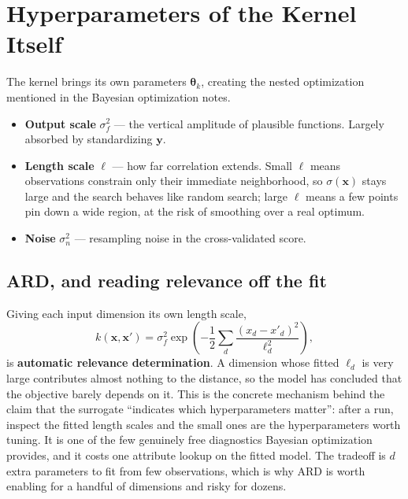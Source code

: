 \documentclass[conference]{IEEEtran}
\begin{document}
\section*{Hyperparameters of the Kernel Itself}
The kernel brings its own parameters $\boldsymbol{\theta}_k$, creating the nested optimization mentioned in the Bayesian optimization notes.

\begin{itemize}
    \item \textbf{Output scale} $\sigma_f^2$ --- the vertical amplitude of plausible functions. Largely absorbed by standardizing $\mathbf{y}$.
    \item \textbf{Length scale} $\ell$ --- how far correlation extends. Small $\ell$ means observations constrain only their immediate neighborhood, so $\sigma(\mathbf{x})$ stays large and the search behaves like random search; large $\ell$ means a few points pin down a wide region, at the risk of smoothing over a real optimum.
    \item \textbf{Noise} $\sigma_n^2$ --- resampling noise in the cross-validated score.
\end{itemize}

\subsection*{ARD, and reading relevance off the fit}
Giving each input dimension its own length scale,
\begin{equation}
    k(\mathbf{x},\mathbf{x}') = \sigma_f^2 \exp\!\left(-\frac{1}{2}\sum_{d} \frac{(x_d - x'_d)^2}{\ell_d^2}\right),
\end{equation}
is \textbf{automatic relevance determination}. A dimension whose fitted $\ell_d$ is very large contributes almost nothing to the distance, so the model has concluded that the objective barely depends on it. This is the concrete mechanism behind the claim that the surrogate ``indicates which hyperparameters matter'': after a run, inspect the fitted length scales and the small ones are the hyperparameters worth tuning. It is one of the few genuinely free diagnostics Bayesian optimization provides, and it costs one attribute lookup on the fitted model. The tradeoff is $d$ extra parameters to fit from few observations, which is why ARD is worth enabling for a handful of dimensions and risky for dozens.
\end{document}
